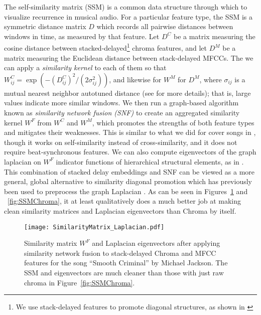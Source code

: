 \documentclass{article}
\begin{document}
The self-similarity matrix (SSM) is a common data structure through which to visualize recurrence in musical audio.  For a particular feature type, the SSM is a symmetric distance matrix $D$ which records all pairwise distances between windows in time, as measured by that feature.  Let $D^C$ be a matrix measuring the cosine distance between stacked-delayed\footnote{We use stack-delayed features to promote diagonal structures, as shown in \cite{tralie2017quasi}}\cite{serra2009cross} chroma features, and let $D^M$ be a matrix measuring the Euclidean distance between stack-delayed MFCCs.  The we can apply a {\em similarity kernel} to each of them so that $W^C_{ij} = \exp (-(D^C_{ij})^2 / (2 \sigma_{ij}^2) )$, and likewise for $W^M$ for $D^M$, where $\sigma_{ij}$ is a mutual nearest neighbor autotuned distance (see \cite{wang2012unsupervised, wang2014similarity} for more details); that is, large values indicate more similar  windows.  We then run a graph-based algorithm known as {\em similarity network fusion (SNF)}\cite{wang2012unsupervised, wang2014similarity, Chen2017CSFusion}  to create an aggregated similarity kernel $W^F$ from $W^C$ and $W^M$, which promotes the strengths of both feature types and mitigates their weaknesses.  This is similar to what we did for cover songs in \cite{tralie2017cover}, though it works on self-similarity instead of cross-similarity, and it does not require beat-synchronous features.  We can also compute eigenvectors of the graph laplacian on $W^F$ indicator functions of hierarchical structural elements, as in \cite{mcfee2014analyzing}.  This combination of stacked delay embeddings and SNF can be viewed as a more general, global alternative to similarity diagonal promotion which has previously been used to preprocess the graph Laplacian \cite{mcfee2014analyzing}.  As can be seen in Figures~\ref{fig:SSMFused} and ~\ref{fig:SSMChroma}, it at least qualitatively does a much better job at making clean similarity matrices and Laplacian eigenvectors than Chroma by itself.


\begin{figure}
    \centering
    \texttt{[image: SimilarityMatrix\_Laplacian.pdf]}
    \caption{Similarity matrix $W^F$ and Laplacian eigenvectors after applying similarity network fusion to stack-delayed Chroma and MFCC features for the song ``Smooth Criminal'' by Michael Jackson.  The SSM and eigenvectors are much cleaner than those with just raw chroma in Figure~\ref{fig:SSMChroma}.}
    \label{fig:SSMFused}
   \end{figure}
\end{document}
